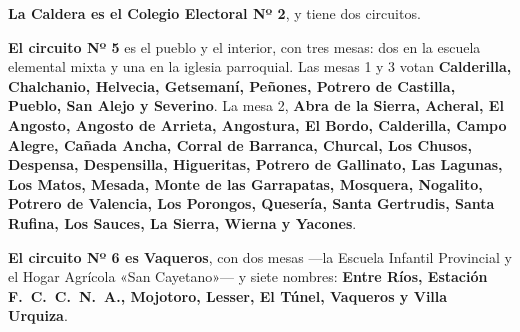 \textbf{La Caldera es el Colegio Electoral Nº 2}, y tiene dos circuitos.

\textbf{El circuito Nº 5} es el pueblo y el interior, con tres mesas: dos en la escuela
elemental mixta y una en la iglesia parroquial. Las mesas 1 y 3 votan
\textbf{Calderilla, Chalchanio, Helvecia, Getsemaní, Peñones, Potrero de Castilla, Pueblo,
San Alejo y Severino}. La mesa 2, \textbf{Abra de la Sierra, Acheral, El Angosto, Angosto
de Arrieta, Angostura, El Bordo, Calderilla, Campo Alegre, Cañada Ancha, Corral de
Barranca, Churcal, Los Chusos, Despensa, Despensilla, Higueritas, Potrero de Gallinato,
Las Lagunas, Los Matos, Mesada, Monte de las Garrapatas, Mosquera, Nogalito, Potrero de
Valencia, Los Porongos, Quesería, Santa Gertrudis, Santa Rufina, Los Sauces, La Sierra,
Wierna y Yacones}.

\textbf{El circuito Nº 6 es Vaqueros}, con dos mesas ---la Escuela Infantil Provincial y el
Hogar Agrícola «San Cayetano»--- y siete nombres: \textbf{Entre Ríos, Estación
F.\ C.\ C.\ N.\ A., Mojotoro, Lesser, El Túnel, Vaqueros y Villa Urquiza}.

